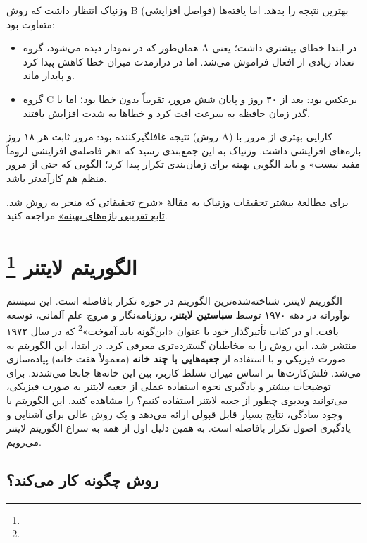 \documentclass[12pt]{report}
\begin{document}
وزنیاک انتظار داشت که روش B (فواصل افزایشی) بهترین نتیجه را بدهد. اما یافته‌ها متفاوت بود:
\begin{itemize}
    \item همان‌طور که در نمودار دیده می‌شود، گروه A در ابتدا خطای بیشتری داشت؛ یعنی تعداد زیادی از افعال فراموش می‌شد. اما در درازمدت میزان خطا کاهش پیدا کرد و پایدار ماند.
    \item گروه C برعکس بود: بعد از ۳۰ روز و پایان شش مرور، تقریباً بدون خطا بود؛ اما با گذر زمان حافظه به سرعت افت کرد و خطاها به شدت افزایش یافتند.
\end{itemize}

نتیجه غافلگیرکننده بود: مرور ثابت هر ۱۸ روز (روش A) کارایی بهتری از مرور با بازه‌های افزایشی داشت. وزنیاک به این جمع‌بندی رسید که «هر فاصله‌ی افزایشی لزوماً مفید نیست» و باید الگویی بهینه برای زمان‌بندی تکرار پیدا کرد؛ الگویی که حتی از مرور منظم هم کارآمدتر باشد.

برای مطالعهٔ بیشتر تحقیقات وزنیاک به مقالهٔ \href{https://super-memory.com/english/ol/beginning.htm}{«شرح تحقیقاتی که منجر به روش  شد. تابع تقریبی بازه‌های بهینه»} مراجعه کنید.

\chapter{الگوریتم لایتنر
\protect\footnote{}
}

الگوریتم لایتنر، شناخته‌شده‌ترین الگوریتم در حوزه تکرار بافاصله است. این سیستم نوآورانه در دهه ۱۹۷۰ توسط \textbf{سباستین لایتنر}، روزنامه‌نگار و مروج علم آلمانی، توسعه یافت. او در کتاب تأثیرگذار خود با عنوان «این‌گونه باید آموخت»\footnote{} که در سال ۱۹۷۲ منتشر شد، این روش را به مخاطبان گسترده‌تری معرفی کرد.
در ابتدا، این الگوریتم به صورت فیزیکی و با استفاده از \textbf{جعبه‌هایی با چند خانه} (معمولاً هفت خانه) پیاده‌سازی می‌شد. فلش‌کارت‌ها بر اساس میزان تسلط کاربر، بین این خانه‌ها جابجا می‌شدند. برای توضیحات بیشتر و یادگیری نحوه استفاده عملی از جعبه لایتنر به صورت فیزیکی، می‌توانید ویدیوی \href{https://www.youtube.com/watch?v=JMoFwgdourI}{چطور از جعبه لایتنر استفاده کنیم؟} را مشاهده کنید.
این الگوریتم با وجود سادگی، نتایج بسیار قابل قبولی ارائه می‌دهد و یک روش عالی برای آشنایی و یادگیری اصول تکرار بافاصله است.
به همین دلیل اول از همه به سراغ الگوریتم لایتنر می‌رویم.


\section{روش  چگونه کار می‌کند؟}
\end{document}
